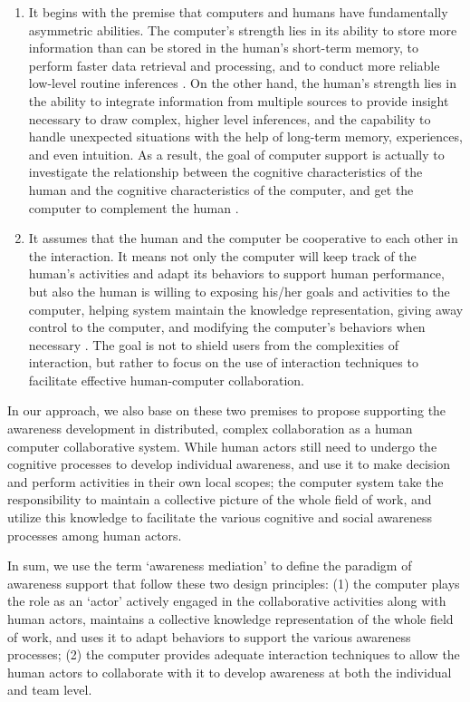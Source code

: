 \begin{enumerate}
   \item It begins with the premise that computers and humans have fundamentally asymmetric abilities. The computer's strength lies in its ability to store more information than can be stored in the human's short-term memory, to perform faster data retrieval and processing, and to conduct more reliable low-level routine inferences \cite{Brown99activeuser}. On the other hand, the human's strength lies in the ability to integrate information from multiple sources to provide insight necessary to draw complex, higher level inferences, and the capability to handle unexpected situations with the help of long-term memory, experiences, and even intuition. As a result, the goal of computer support is actually to investigate the relationship between the cognitive characteristics of the human and the cognitive characteristics of the computer, and get the computer to complement the human \cite{Dalal1994}.
   \item It assumes that the human and the computer be cooperative to each other in the interaction. It means not only the computer will keep track of the human's activities and adapt its behaviors to support human performance, but also the human is willing to exposing his/her goals and activities to the computer, helping system maintain the knowledge representation, giving away control to the computer, and modifying the computer's behaviors when necessary \cite{Terveen1995}. The goal is not to shield users from the complexities of interaction, but rather to focus on the use of interaction techniques to facilitate effective human-computer collaboration.
\end{enumerate}

In our approach, we also base on these two premises to propose supporting the awareness development in distributed, complex collaboration as a human computer collaborative system. While human actors still need to undergo the cognitive processes to develop individual awareness, and use it to make decision and perform activities in their own local scopes; the computer system take the responsibility to maintain a collective picture of the whole field of work, and utilize this knowledge to facilitate the various cognitive and social awareness processes among human actors.

In sum, we use the term `awareness mediation' to define the paradigm of awareness support that follow these two design principles: (1) the computer plays the role as an `actor' actively engaged in the collaborative activities along with human actors, maintains a collective knowledge representation of the whole field of work, and uses it to adapt behaviors to support the various awareness processes; (2) the computer provides adequate interaction techniques to allow the human actors to collaborate with it to develop awareness at both the individual and team level. 

